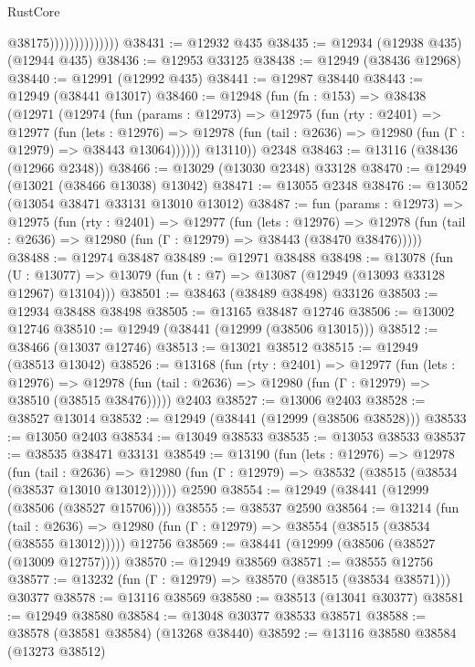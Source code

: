 \begin{lexlean}{RustCore}
\begin{coremodule}
                                @38175))))))))))))))
@38431 := @12932 @435
@38435 := @12934 (@12938 @435) (@12944 @435)
@38436 := @12953 @33125
@38438 := @12949 (@38436 @12968)
@38440 := @12991 (@12992 @435)
@38441 := @12987 @38440
@38443 := @12949 (@38441 @13017)
@38460 := @12948
    (fun (fn : @153) =>
    @38438
      (@12971
        (@12974
          (fun (params : @12973) =>
          @12975
            (fun (rty : @2401) =>
            @12977
              (fun (lets : @12976) =>
              @12978 (fun (tail : @2636) => @12980 (fun (Γ : @12979) => @38443 @13064))))))
        @13110))
    @2348
@38463 := @13116 (@38436 (@12966 @2348))
@38466 := @13029 (@13030 @2348) @33128
@38470 := @12949 (@13021 (@38466 @13038) @13042)
@38471 := @13055 @2348
@38476 := @13052 (@13054 @38471 @33131 @13010 @13012)
@38487 := fun (params : @12973) =>
  @12975
    (fun (rty : @2401) =>
    @12977
      (fun (lets : @12976) =>
      @12978 (fun (tail : @2636) => @12980 (fun (Γ : @12979) => @38443 (@38470 @38476)))))
@38488 := @12974 @38487
@38489 := @12971 @38488
@38498 := @13078
    (fun (U : @13077) => @13079 (fun (t : @7) => @13087 (@12949 (@13093 @33128 @12967) @13104)))
@38501 := @38463 (@38489 @38498) @33126
@38503 := @12934 @38488 @38498
@38505 := @13165 @38487 @12746
@38506 := @13002 @12746
@38510 := @12949 (@38441 (@12999 (@38506 @13015)))
@38512 := @38466 (@13037 @12746)
@38513 := @13021 @38512
@38515 := @12949 (@38513 @13042)
@38526 := @13168
    (fun (rty : @2401) =>
    @12977
      (fun (lets : @12976) =>
      @12978 (fun (tail : @2636) => @12980 (fun (Γ : @12979) => @38510 (@38515 @38476)))))
    @2403
@38527 := @13006 @2403
@38528 := @38527 @13014
@38532 := @12949 (@38441 (@12999 (@38506 @38528)))
@38533 := @13050 @2403
@38534 := @13049 @38533
@38535 := @13053 @38533
@38537 := @38535 @38471 @33131
@38549 := @13190
    (fun (lets : @12976) =>
    @12978
      (fun (tail : @2636) =>
      @12980 (fun (Γ : @12979) => @38532 (@38515 (@38534 (@38537 @13010 @13012))))))
    @2590
@38554 := @12949 (@38441 (@12999 (@38506 (@38527 @15706))))
@38555 := @38537 @2590
@38564 := @13214
    (fun (tail : @2636) => @12980 (fun (Γ : @12979) => @38554 (@38515 (@38534 (@38555 @13012)))))
    @12756
@38569 := @38441 (@12999 (@38506 (@38527 (@13009 @12757))))
@38570 := @12949 @38569
@38571 := @38555 @12756
@38577 := @13232 (fun (Γ : @12979) => @38570 (@38515 (@38534 @38571))) @30377
@38578 := @13116 @38569
@38580 := @38513 (@13041 @30377)
@38581 := @12949 @38580
@38584 := @13048 @30377 @38533 @38571
@38588 := @38578 (@38581 @38584) (@13268 @38440)
@38592 := @13116 @38580 @38584 (@13273 @38512)

\end{coremodule}
\end{lexlean}
